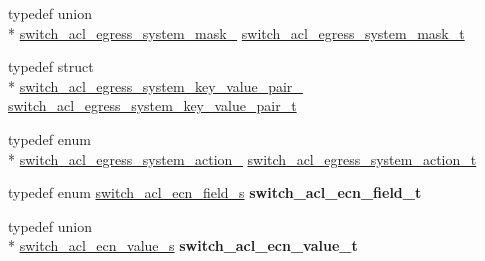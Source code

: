 \begin{DoxyCompactItemize}
typedef union \\*
\hyperlink{unionswitch__acl__egress__system__mask__}{switch\+\_\+acl\+\_\+egress\+\_\+system\+\_\+mask\+\_\+} \hyperlink{group__ACL_gab1587ad95d0aa8366975ee469308512f}{switch\+\_\+acl\+\_\+egress\+\_\+system\+\_\+mask\+\_\+t}
\item 
typedef struct \\*
\hyperlink{structswitch__acl__egress__system__key__value__pair__}{switch\+\_\+acl\+\_\+egress\+\_\+system\+\_\+key\+\_\+value\+\_\+pair\+\_\+} \hyperlink{group__ACL_ga6e1741a933a437ef978c4a852da58db9}{switch\+\_\+acl\+\_\+egress\+\_\+system\+\_\+key\+\_\+value\+\_\+pair\+\_\+t}
\item 
typedef enum \\*
\hyperlink{group__ACL_ga3f3d6a633ebb6283aad6b971ec96333d}{switch\+\_\+acl\+\_\+egress\+\_\+system\+\_\+action\+\_\+} \hyperlink{group__ACL_ga8b7e3e3fd7b16beb665b2a8109200b87}{switch\+\_\+acl\+\_\+egress\+\_\+system\+\_\+action\+\_\+t}
\item 
\hypertarget{group__ACL_gaa2035c6060acd6e9440875b7a979dfab}{typedef enum \hyperlink{group__ACL_ga4e63c132b7660557ab1b847aac2b711b}{switch\+\_\+acl\+\_\+ecn\+\_\+field\+\_\+s} {\bfseries switch\+\_\+acl\+\_\+ecn\+\_\+field\+\_\+t}}\label{group__ACL_gaa2035c6060acd6e9440875b7a979dfab}

\item 
\hypertarget{group__ACL_gae8f2962cb01fd8ecca3ade5bd570ef03}{typedef union \\*
\hyperlink{unionswitch__acl__ecn__value__s}{switch\+\_\+acl\+\_\+ecn\+\_\+value\+\_\+s} {\bfseries switch\+\_\+acl\+\_\+ecn\+\_\+value\+\_\+t}}\label{group__ACL_gae8f2962cb01fd8ecca3ade5bd570ef03}


\end{DoxyCompactItemize}
